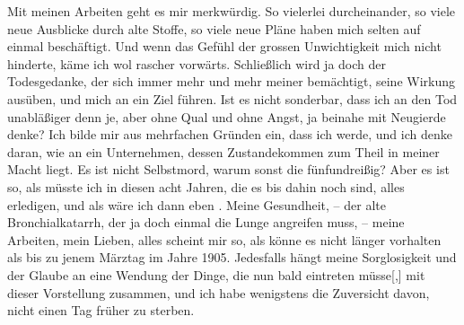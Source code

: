 \pstart
           {\pb}Mit meinen Arbeiten geht es
               mir merkwürdig. So vielerlei durcheinander, so viele neue Ausblicke durch alte
               Stoffe, so viele neue Pläne haben mich selten auf einmal beschäftigt. Und wenn das
               Gefühl der grossen Unwichtigkeit mich nicht hinderte, käme ich wol rascher vorwärts.
               Schließlich wird ja doch der Todesgedanke, der sich immer mehr und mehr meiner
               bemächtigt, seine Wirkung ausüben, und mich an ein Ziel führen. Ist es nicht
               sonderbar, dass ich an den Tod unabläßiger denn je, aber ohne Qual und ohne Angst, ja
               beinahe mit Neugierde denke? Ich bilde mir aus mehrfachen Gründen ein, dass ich
                  \label{K_L03266-4v}\label{K_L03266-4h} werde, und ich denke daran, wie an
               ein Unternehmen, dessen Zustandekommen zum Theil in meiner Macht liegt. Es ist nicht
               Selbstmord, warum sonst die fünfundreißig? Aber es ist so, als müsste ich in diesen
                  {\pb}acht Jahren, die es bis
               dahin noch sind, alles erledigen, und als wäre ich dann eben \label{K_L03266-5v}\label{K_L03266-5h}. Meine Gesundheit, – der alte Bronchialkatarrh, der ja doch einmal
               die Lunge angreifen muss, – meine Arbeiten, mein Lieben, alles scheint mir so, als
               könne es nicht länger vorhalten als bis zu jenem Märztag im Jahre 1905. Jedesfalls hängt meine Sorglosigkeit und der Glaube an eine Wendung
               der Dinge, die nun bald eintreten müsse{[},{]} mit dieser Vorstellung
               zusammen, und ich habe wenigstens die Zuversicht davon, nicht einen Tag früher zu
               sterben.\pend
           
